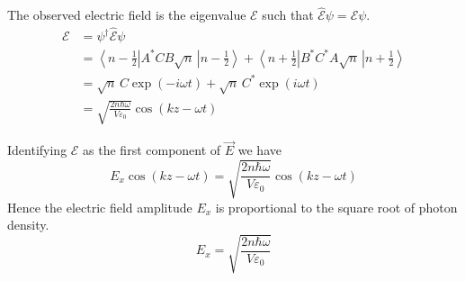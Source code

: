 \documentclass[12pt]{article}
\begin{document}
\noindent
The observed electric field is the eigenvalue $\mathscr{E}$ such that $\hat{\mathscr{E}}\psi=\mathscr{E}\psi$.
\begin{align*}
\mathscr{E}
&=\psi^\dagger\hat{\mathscr{E}}\psi\\
&=\left\langle n-\tfrac{1}{2}\right|A^*CB\sqrt{n}\,\left|n-\tfrac{1}{2}\right\rangle
+\left\langle n+\tfrac{1}{2}\right|B^*C^*A\sqrt{n}\,\left|n+\tfrac{1}{2}\right\rangle\\
&=\sqrt{n}\,C\exp(-i\omega t)+\sqrt{n}\,C^*\exp(i\omega t)\\
&=\sqrt{\frac{2n\hbar\omega}{V\varepsilon_0}}\cos(kz-\omega t)
\end{align*}

\noindent
Identifying $\mathscr{E}$ as the first component of $\vec{E}$ we have
$$
E_x\cos(kz-\omega t)=\sqrt{\frac{2n\hbar\omega}{V\varepsilon_0}}\cos(kz-\omega t)
$$
Hence the electric field amplitude $E_x$ is proportional to the square root of photon density.
$$
E_x=\sqrt{\frac{2n\hbar\omega}{V\varepsilon_0}}
$$
\end{document}

